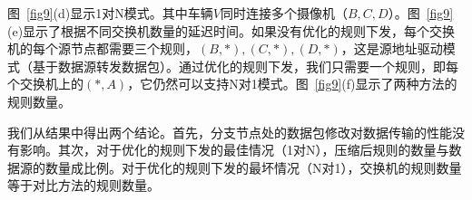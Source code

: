 图~\ref{fig9}(d)显示1对N模式。其中车辆$V$同时连接多个摄像机（$B, C, D$）。图~\ref{fig9}(e)显示了根据不同交换机数量的延迟时间。如果没有优化的规则下发，每个交换机的每个源节点都需要三个规则，$(B, *), (C, *), (D, *)$，这是源地址驱动模式（基于数据源转发数据包）。通过优化的规则下发，我们只需要一个规则，即每个交换机上的$(*, A)$，它仍然可以支持N对1模式。图~\ref{fig9}(f)显示了两种方法的规则数量。



我们从结果中得出两个结论。首先，分支节点处的数据包修改对数据传输的性能没有影响。其次，对于优化的规则下发的最佳情况（1对N），压缩后规则的数量与数据源的数量成比例。对于优化的规则下发的最坏情况（N对1），交换机的规则数量等于对比方法的规则数量。



